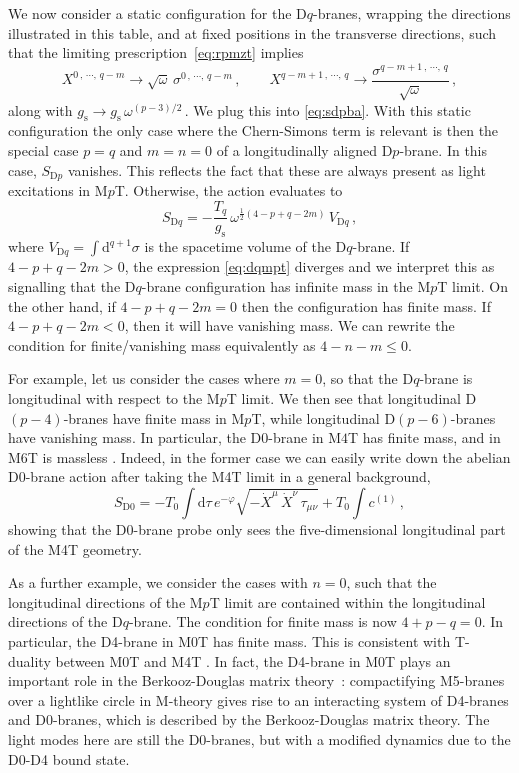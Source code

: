 \documentclass[11pt]{article}
\newcommand{\be}{\begin{equation}}
\newcommand{\ee}{\end{equation}}
\newcommand{\dd}{\mathrm{d}}
\begin{document}
We now consider a static configuration for the D$q$-branes, wrapping the directions illustrated in this table, and at fixed positions in the transverse directions, such that the limiting prescription~\eqref{eq:rpmzt} implies
%
\be
\label{DqScalingX}
    X^{0\,, \, \cdots, \, q - m} \rightarrow \sqrt{\omega} \, \sigma^{0\,, \, \cdots, \, q - m}\,,
        \qquad%
    X^{q-m+1\,, \, \cdots, \, q} \rightarrow \frac{\sigma^{q-m+1\,, \, \cdots, \, q}}{\sqrt{\omega}}\,,
\ee
%
along with $g^{}_\text{s} \rightarrow g^{}_\text{s} \, \omega^{(p-3)/2}$\,.
We plug this into \eqref{eq:sdpba}. 
With this static configuration the only case where the Chern-Simons term is relevant is then the special case $p=q$ and $m=n=0$ of a longitudinally aligned D$p$-brane. In this case, $S_{\text{D}p}$ vanishes.
This reflects the fact that these are always present as light excitations in M$p$T. 
Otherwise, the action evaluates to
\be
 S^{}_\text{D$q$} = - \frac{T_q}{g_\text{s}} \, \omega^{\frac{1}{2} (4 - p +q -2m) } \, V_{\text{D}q}\,,
\label{eq:dqmpt}
\ee
where $V_{\text{D}q} = \int \dd^{q+1} \sigma$ is the spacetime volume of the D$q$-brane.
If $4-p+q-2m>0$, the expression \eqref{eq:dqmpt} diverges and we interpret this as signalling that the D$q$-brane configuration has infinite mass in the M$p$T limit.
On the other hand, if $4-p+q-2m=0$ then the configuration has finite mass. 
If $4-p+q-2m < 0$, then it will have vanishing mass. 
We can rewrite the condition for finite/vanishing mass equivalently as $4-n-m \leq 0$.

For example, let us consider the cases where $m=0$, so that the D$q$-brane is longitudinal with respect to the M$p$T limit.
We then see that longitudinal D$(p-4)$-branes have finite mass in M$p$T, while longitudinal D$(p-6)$-branes have vanishing mass.
In particular, the D0-brane in M$4$T has finite mass, and in M$6$T is massless \cite{Sen:1997we}. Indeed, in the former case we can easily write down the abelian D0-brane action after taking the M4T limit in a general background,
%
\be
S_{\text{D$0$}}= - T_0 \int \dd \tau \,e^{-\varphi} \sqrt{- \dot{X}^\mu \, \dot{X}^\nu \, \tau_{\mu\nu}} + T_0 \int c^{(1)} \,,
\ee
%
showing that the D0-brane probe only sees the five-dimensional longitudinal part of the M4T geometry.

As a further example, we consider the cases with $n=0$, such that the longitudinal directions of the M$p$T limit are contained within the longitudinal directions of the D$q$-brane.
The condition for finite mass is now $4 + p -q = 0$.
In particular, the D4-brane in M0T has finite mass. 
This is consistent with T-duality between M0T and M4T \cite{Sen:1997we}.
In fact, the D4-brane in M0T plays an important role in the Berkooz-Douglas matrix theory~\cite{Berkooz:1996is}: 
compactifying M5-branes over a lightlike circle in M-theory gives rise to an interacting system of D4-branes and D0-branes, which is described by the Berkooz-Douglas matrix theory. The light modes here are still the D0-branes, but with a modified dynamics due to the D0-D4 bound state. 
\end{document}
